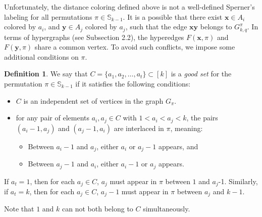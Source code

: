\documentclass{birkjour}
\theoremstyle{definition}
\newtheorem{defn}[thm]{Definition}
\theoremstyle{remark}
\numberwithin{equation}{section}
\begin{document}
Unfortunately, the distance coloring defined above is not a
well-defined Sperner's labeling for all permutations $\pi\in
\mathbb{S}_{k-1}$. It is a possible that there exist
$\mathbf{x}\in A_{i}$ colored by $a_i$, and $\mathbf{y}\in A_j$
colored by $a_j$, such that the edge $\mathbf{x}\mathbf{y}$
belongs to $G^\pi_{k,q}$. In terms of hypergraphs (see Subsection
2.2), the hyperedges $F(\mathbf{x},\pi)$ and $F(\mathbf{y},\pi)$
share a common vertex. To avoid such conflicts, we impose some
additional conditions on $\pi$.


\begin{defn}\label{D:goodset}
We say that \( C = \{a_1, a_2, \ldots, a_t\} \subset [k] \) is a
\textit{good set} for the permutation \( \pi \in \mathbb{S}_{k-1}
\) if it satisfies the following conditions:
\begin{itemize}
    \item[(a)] \(C\) is an independent set of vertices
    in the graph \(G_\pi\).
    \item[(b)] for any pair of elements $a_i, a_j \in C$ with
    $1<a_i<a_j<k$,
     the pairs \((a_i - 1, a_j)\) and \((a_j - 1, a_i)\)
     are interlaced in \(\pi\), meaning:
    \begin{itemize}
        \item[(i)] Between \(a_i - 1\) and \(a_j\),
         either \(a_i\) or \(a_j - 1\) appears, and
        \item[(ii)] Between \(a_j - 1\) and \(a_i\),
        either \(a_i - 1\) or \(a_j\) appears.
    \end{itemize}
\end{itemize}

If $a_t=1$, then for each $a_j\in C$, $a_j$ must appear in $\pi$
between $1$ and $a_{j}$-1. Similarly, if $a_t=k$, then for each
$a_j\in C$, $a_{j}-1$ must appear in $\pi$ between $a_j$ and
$k-1$.\end{defn} Note that $1$ and $k$ can not both belong to $C$
simultaneously.
\end{document}
